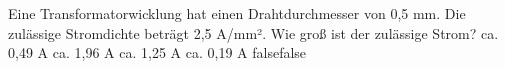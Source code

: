    {Eine Transformatorwicklung hat einen Drahtdurchmesser von 0,5 mm. Die zulässige Stromdichte beträgt 2,5 A/mm². Wie groß ist der zulässige Strom?}
    {ca. 0,49 A}
    {ca. 1,96 A}
    {ca. 1,25 A}
    {ca. 0,19 A}
    {false}{false}